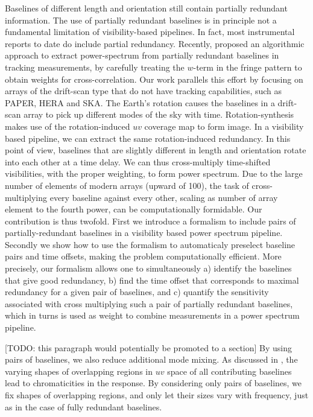 \documentclass[twocolumn,apj,numberedappendix]{emulateapj}
\renewcommand\[{\begin{equation}}
\renewcommand\]{\end{equation}}
\begin{document}
Baselines of different length and orientation still contain partially redundant information. The use of partially redundant baselines is in principle not a fundamental limitation of visibility-based pipelines. In fact, most instrumental reports to date do include partial redundancy. Recently, \cite{wterm} proposed an algorithmic approach to extract power-spectrum from partially redundant baselines in tracking measurements, by carefully treating the $w$-term in the fringe pattern to obtain weights for cross-correlation. Our work parallels this effort by focusing on arrays of the drift-scan type that do not have tracking capabilities, such as PAPER, HERA and SKA.
The Earth's rotation causes the baselines in a drift-scan array to pick up different modes of the sky with time. Rotation-synthesis makes use of the rotation-induced $uv$ coverage map to form image. In a visibility based pipeline, we can extract the same rotation-induced redundancy. In this point of view, baselines that are slightly different in length and orientation
rotate into each other at a time delay. We can thus cross-multiply time-shifted visibilities, with the proper weighting, to form power spectrum.  Due to the large number of elements of modern arrays (upward of 100), the task of cross-multiplying every baseline against every other, scaling as number of array element to the fourth power, can be computationally formidable. Our contribution is thus twofold. First we introduce a formalism to include pairs of partially-redundant baselines in a visibility based power spectrum pipeline. Secondly we show how to use the formalism to automaticaly preselect baseline pairs and time offsets, making the problem computationally efficient. More precisely, our formalism allows one to simultaneously a) identify the baselines that give good
redundancy, b) find the time offset that corresponds to maximal redundancy for a given pair of baselines, and
c) quantify the sensitivity associated with cross multiplying
such a pair of partially redundant baselines, which in turns is used as weight to combine measurements in a power spectrum pipeline. 

[TODO: this paragraph would potentially be promoted to a section] By using pairs of baselines, we also reduce additional mode mixing. As discussed in \cite{Hazelton2013}, the varying shapes of overlapping regions in $uv$ space of all contributing baselines lead to chromaticities in the response. By considering only pairs of baselines, we fix shapes of overlapping regions, and only let their sizes vary with frequency, just as in the case of fully redundant baselines.  
\end{document}
